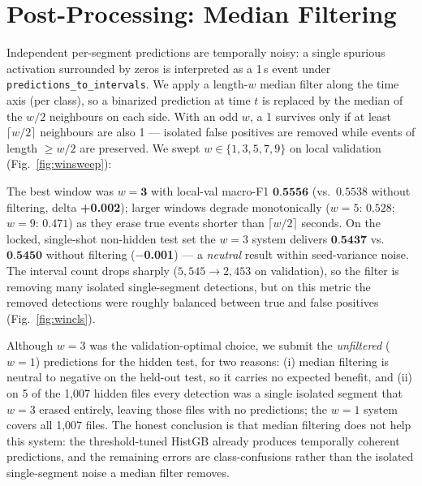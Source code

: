\documentclass{article}
\begin{document}
\section{Post-Processing: Median Filtering}
\label{sec:postproc}

Independent per-segment predictions are temporally noisy: a single
spurious activation surrounded by zeros is interpreted as a 1\,s event
under \texttt{predictions\_to\_intervals}. We apply a length-$w$
median filter along the time axis (per class), so a binarized
prediction at time $t$ is replaced by the median of the $w/2$ neighbours
on each side. With an odd $w$, a 1 survives only if at least
$\lceil w/2 \rceil$ neighbours are also 1 --- isolated false positives
are removed while events of length $\geq w/2$ are preserved. We swept
$w \in \{1, 3, 5, 7, 9\}$ on local validation (Fig.~\ref{fig:winsweep}):


The best window was $w{=}\textbf{3}$ with local-val macro-F1
$\textbf{0.5556}$ (vs.\ $0.5538$ without filtering, delta \textbf{+0.002});
larger windows degrade monotonically ($w{=}5$: $0.528$; $w{=}9$:
$0.471$) as they erase true events shorter than $\lceil w/2 \rceil$
seconds. On the locked, single-shot non-hidden test set the
$w{=}3$ system delivers $\textbf{0.5437}$ vs.\ $\textbf{0.5450}$ without
filtering (\textbf{$-$0.001}) --- a \emph{neutral} result within
seed-variance noise. The interval count drops sharply ($5{,}545 \to
2{,}453$ on validation), so the filter is removing many isolated
single-segment detections, but on this metric the removed detections
were roughly balanced between true and false positives
(Fig.~\ref{fig:wincls}).


Although $w{=}3$ was the validation-optimal choice, we submit the
\emph{unfiltered} ($w{=}1$) predictions for the hidden test, for two
reasons: (i) median filtering is neutral to negative on the held-out
test, so it carries no expected benefit, and (ii) on 5 of the 1{,}007
hidden files every detection was a single isolated segment that $w{=}3$
erased entirely, leaving those files with no predictions; the $w{=}1$
system covers all 1{,}007 files. The honest conclusion is that median
filtering does not help this system: the threshold-tuned HistGB already
produces temporally coherent predictions, and the remaining errors are
class-confusions rather than the isolated single-segment noise a median
filter removes.

\end{document}
